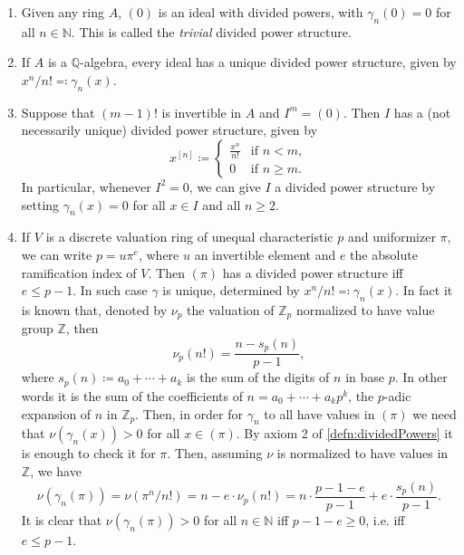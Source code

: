 \begin{ex}\leavevmode\vspace{-.2\baselineskip}
\begin{enumerate}\label{PDexamples}
	\item Given any ring $A$, $(0)$ is an ideal with divided powers,
		with $\gamma_n(0) = 0$ for all $n \in \mathbb{N}$.
		This is called the \emph{trivial} divided power structure.

	\item If $A$ is a $\mathbb{Q}$-algebra, every ideal has a unique
		divided power structure, given by $x^n/n! \eqqcolon \gamma_n(x)$.

	\item\label{PDEx:NilpotentIdeal} Suppose that $\left( m-1 \right)!$ is invertible in $A$ and 
		$I^m = (0)$.
		Then $I$ has a (not necessarily unique) divided power structure, given by
		\begin{equation*}
			x^{[n]} \coloneqq
			\begin{cases}
				\frac{ x^n }{ n! } & \text{if } n < m,\\
				0 & \text{if } n \geq m.
			\end{cases} 
		\end{equation*}
		In particular, whenever $I^2 = 0$, we can give $I$ a
		divided power structure by setting $\gamma_n(x) = 0$
		for all $x \in I$ and all $n \geq 2$.

	\item\label{PDex:DVR} If $V$ is a discrete valuation ring of unequal characteristic $p$
		and uniformizer $\pi$, we can write $p = u \pi^e$,
		where $u$ an invertible element and $e$ the absolute ramification
		index of $V$.
		Then $\left( \pi \right)$ has a divided power structure iff $e \leq p-1$.
		In such case $\gamma$ is unique, determined by
		$x^n/n! \eqqcolon \gamma_n(x)$.
		In fact it is known that, denoted by $\nu_p$ the valuation
		of $\mathbb{Z}_{p}$ normalized to have value group $\mathbb{Z}$,
		then
		\begin{equation*}
			\nu_p(n!) = 
			\frac{n - s_p(n)}{p-1}
		,\end{equation*}
		where $s_p(n) \coloneqq a_0 + \cdots + a_k$ is the sum of the
		digits of $n$ in base $p$. In other words it is the
		sum of the coefficients of $n = a_0 + \cdots + a_kp^k$,
		the $p$-adic expansion of $n$ in $\mathbb{Z}_{p}$.
		Then, in order for $\gamma_n$ to all have values in $(\pi)$
		we need that $\nu(\gamma_n(x)) > 0$ for all $x \in (\pi)$.
		By axiom 2 of \cref{defn:dividedPowers}
		it is enough to check it for $\pi$.
		Then, assuming $\nu$ is normalized to have values in $\mathbb{Z}$,
		we have
		\begin{equation*}
			\nu(\gamma_n(\pi)) = \nu(\pi^n/n!) =
			n - e \cdot \nu_p(n!) =
			n \cdot \frac{p - 1 - e}{p - 1} + e \cdot \frac{s_p(n)}{p - 1}
		.\end{equation*}
		It is clear that $\nu(\gamma_n(\pi)) > 0$ for all $n \in \mathbb{N}$
		iff $p - 1 - e \geq 0$, i.e. iff $e \leq p - 1$.
\end{enumerate}
\end{ex} 


